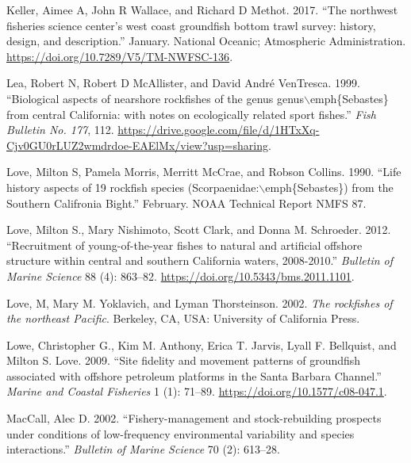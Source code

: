 \documentclass[
  english,
  a4paper,
]{article}
\newlength{\cslhangindent}
\newlength{\cslentryspacingunit} %
\newenvironment{CSLReferences}[2] %
 {%
  \setlength{\parindent}{0pt}
  \ifodd #1
  \let\oldpar\par
  \def\par{\hangindent=\cslhangindent\oldpar}
  \fi
  \setlength{\parskip}{#2\cslentryspacingunit}
 }%
 {}
\begin{document}
\begin{CSLReferences}{1}{0}
\leavevmode{}%
Keller, Aimee A, John R Wallace, and Richard D Methot. 2017. {``{The northwest fisheries science center's west coast groundfish bottom trawl survey: history, design, and description}.''} January. National Oceanic; Atmospheric Administration. \url{https://doi.org/10.7289/V5/TM-NWFSC-136}.

\leavevmode{}%
Lea, Robert N, Robert D McAllister, and David André VenTresca. 1999. {``{Biological aspects of nearshore rockfishes of the genus genus\(\backslash\)emph{\{}Sebastes{\}} from central California: with notes on ecologically related sport fishes}.''} \emph{Fish Bulletin No. 177}, 112. \url{https://drive.google.com/file/d/1HTxXq-Cjv0GU0rLUZ2wmdrdoe-EAElMx/view?usp=sharing}.

\leavevmode{}%
Love, Milton S, Pamela Morris, Merritt McCrae, and Robson Collins. 1990. {``{Life history aspects of 19 rockfish species (Scorpaenidae:\(\backslash\)emph{\{}Sebastes{\}}) from the Southern Califronia Bight}.''} February. NOAA Technical Report NMFS 87.

\leavevmode{}%
Love, Milton S., Mary Nishimoto, Scott Clark, and Donna M. Schroeder. 2012. {``{Recruitment of young-of-the-year fishes to natural and artificial offshore structure within central and southern California waters, 2008-2010}.''} \emph{Bulletin of Marine Science} 88 (4): 863--82. \url{https://doi.org/10.5343/bms.2011.1101}.

\leavevmode{}%
Love, M, Mary M. Yoklavich, and Lyman Thorsteinson. 2002. \emph{{The rockfishes of the northeast Pacific}}. Berkeley, CA, USA: University of California Press.

\leavevmode{}%
Lowe, Christopher G., Kim M. Anthony, Erica T. Jarvis, Lyall F. Bellquist, and Milton S. Love. 2009. {``{Site fidelity and movement patterns of groundfish associated with offshore petroleum platforms in the Santa Barbara Channel}.''} \emph{Marine and Coastal Fisheries} 1 (1): 71--89. \url{https://doi.org/10.1577/c08-047.1}.

\leavevmode{}%
MacCall, Alec D. 2002. {``{Fishery-management and stock-rebuilding prospects under conditions of low-frequency environmental variability and species interactions}.''} \emph{Bulletin of Marine Science} 70 (2): 613--28.


\end{CSLReferences}
\end{document}
